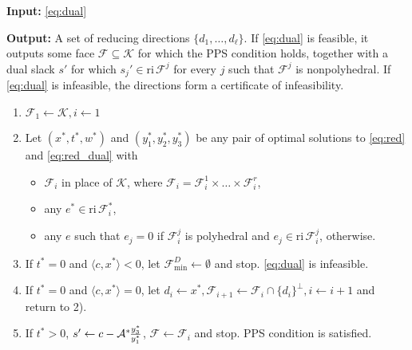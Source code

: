 \documentclass{article}
\newcommand{\reInt}{\mathrm{ri}\,}
\newcommand{\inProd}[2]{\langle #1 , #2 \rangle }
\newcommand{\minFaceD}{ {\mathcal{F}_{\min}^D}}
\newcommand{\stdMap}{ {\mathcal{A}}}
\newcommand{\stdCone}{ {\mathcal{K}}}
\newcommand{\stdFace}{ \mathcal{F}}
\newcommand{\stdInt}{ {e}}
\newcommand{\PPS}{{PPS}}
\newcommand{\T}{\ast\hspace{-1pt}}
\begin{document}
{\bf Input:} \eqref{eq:dual}

{\bf Output:} A set of reducing directions $\{d_1, \ldots, d_\ell\}$. If 
\eqref{eq:dual} is feasible, it outputs  some face $\stdFace \subseteq \stdCone$ 
for which the PPS condition holds, together 
with a dual slack $s'$ for which $s_j' \in \reInt \stdFace ^j $ for every $j$ such that $\stdFace ^j$  is nonpolyhedral.
If \eqref{eq:dual} is infeasible, the directions form a certificate of infeasibility.
\begin{enumerate}
\item $\stdFace _1 \leftarrow \stdCone, i \leftarrow 1 $
\item Let  $(x^*,t^*,w^*)$ and $(y_1^*,y_2^*,y_3^*)$ be any pair of optimal solutions to 
\eqref{eq:red} and \eqref{eq:red_dual} with
\begin{itemize}
	\item $\stdFace _i$ in place of $\stdCone $, where $\stdFace_i = \stdFace_i ^1 \times \ldots \times \stdFace_i  ^r$,
	\item any $\stdInt^* \in \reInt \stdFace _i^*$,
	\item any $\stdInt$  such that $\stdInt _j = 0$ if $\stdFace _i^j$ is polyhedral and 	$\stdInt _j \in \reInt \stdFace _i^j$, otherwise.
\end{itemize}

\item If $t^* = 0$ and  $\inProd{c}{x^*} < 0$, let $\minFaceD \leftarrow \emptyset$ and stop. \eqref{eq:dual}  is infeasible.
\item If $t^* = 0$ and $\inProd{c}{x^*} = 0$, let $d_i \leftarrow x^*, \stdFace _{i+1}  \leftarrow \stdFace _i  \cap \{d_i\}^\perp, i\leftarrow i+1$ and return to 2).
\item If $t^* > 0$, $s' \leftarrow  c  -\stdMap^\T  \frac{y_3^*}{y_1^*}$, $\stdFace \leftarrow \stdFace _i$ and stop. {\PPS} condition is satisfied.
\end{enumerate}
\end{document}
